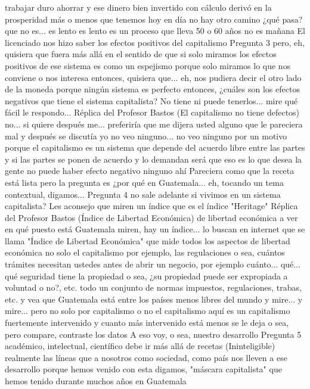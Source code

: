 trabajar duro ahorrar y ese dinero bien invertido con cálculo derivó en la prosperidad más o menos
que tenemos hoy en día no hay otro camino ¿qué pasa? que no es... es lento es lento es un proceso que lleva 50 o 60 años
no es mañana El licenciado nos hizo saber los efectos positivos del capitalismo
Pregunta 3
pero, eh, quisiera que fuera más allá en el sentido de que
si solo miramos los efectos positivos de ese sistema es como un espejismo porque solo miramos
lo que nos conviene o nos interesa entonces, quisiera que... eh, nos pudiera decir
el otro lado de la moneda porque ningún sistema es perfecto entonces, ¿cuáles son los efectos negativos
que tiene el sistema capitalista? No tiene ni puede tenerlos... mire qué fácil le respondo...
Réplica del Profesor Bastos (El capitalismo no tiene defectos)
no... si quiere después me... preferiría que me dijera usted alguno que le pareciera mal y después se discutía yo no veo ninguno...
no veo ninguno por un motivo porque el capitalismo es un sistema que depende del acuerdo libre entre las partes y si las partes se ponen de acuerdo
y lo demandan será que eso es lo que desea la gente no puede haber efecto negativo ninguno ahí
Pareciera como que la receta está lista pero la pregunta es ¿por qué en Guatemala... eh, tocando un tema contextual, digamos...
Pregunta 4
no sale adelante si vivimos en un sistema capitalista? Les aconsejo que miren un índice que es el índice "Heritage"
Réplica del Profesor Bastos (Índice de Libertad Económica)
de libertad económica a ver en qué puesto está Guatemala miren, hay un índice... lo buscan en internet
que se llama "Índice de Libertad Económica" que mide todos los aspectos de libertad económica no solo el capitalismo
por ejemplo, las regulaciones o sea, cuántos trámites necesitan ustedes antes de abrir un negocio, por ejemplo
cuánto... qué... qué seguridad tiene la propiedad o sea, ¿su propiedad puede ser expropiada a voluntad o no?, etc.
todo un conjunto de normas impuestos, regulaciones, trabas, etc. y vea que Guatemala
está entre los países menos libres del mundo y mire... y mire... pero no solo por capitalismo o no
el capitalismo aquí es un capitalismo fuertemente intervenido y cuanto más intervenido está menos se le deja
o sea, pero compare, contraste los datos A eso voy, o sea, nuestro desarrollo
Pregunta 5
académico, intelectual, científico debe ir más allá de recetas (Ininteligible)
realmente las líneas que a nosotros como sociedad, como país nos lleven a ese desarrollo
porque hemos venido con esta digamos, "máscara capitalista" que hemos tenido durante muchos años en Guatemala
